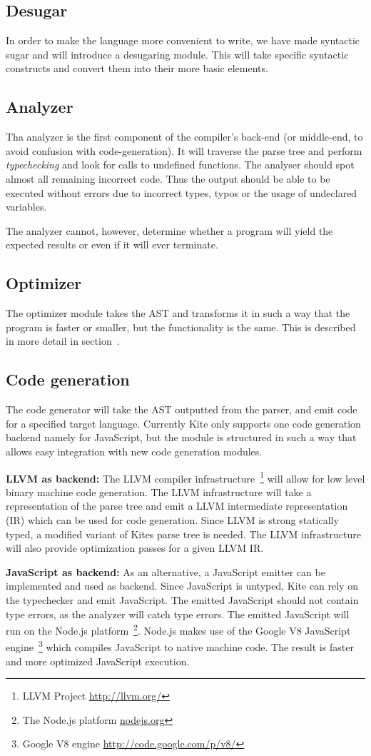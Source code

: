 \subsection{Desugar}
In order to make the language more convenient to write, we have made syntactic sugar and will introduce a desugaring module. This will take specific syntactic constructs and convert them into their more basic elements.


\subsection{Analyzer}
Tha analyzer is the first component of the compiler's back-end (or middle-end, to avoid confusion with code-generation). It will traverse the parse tree and perform \emph{typechecking} and look for calls to undefined functions. The analyser should spot almost all remaining incorrect code. Thus the output should be able to be executed without errors due to incorrect types, typos or the usage of undeclared variables.

The analyzer cannot, however, determine whether a program will yield the expected results or even if it will ever terminate.


\subsection{Optimizer}
The optimizer module takes the AST and transforms it in such a way that the program is faster or smaller, but the functionality is the same. This is described in more detail in section~.


\subsection{Code generation}
The code generator will take the AST outputted from the parser, and emit code for a specified target language. Currently Kite only supports one code generation backend namely for JavaScript, but the module is structured in such a way that allows easy integration with new code generation modules.

\textbf{LLVM as backend:}
The LLVM compiler infrastructure~\footnote{LLVM Project \url{http://llvm.org/}} will allow for low level binary machine code generation. The LLVM infrastructure will take a representation of the parse tree and emit a LLVM intermediate representation (IR) which can be used for code generation. Since LLVM is strong statically typed, a modified variant of Kites parse tree is needed. The LLVM infrastructure will also provide optimization passes for a given LLVM IR.

\textbf{JavaScript as backend:}
As an alternative, a JavaScript emitter can be implemented and used as backend. Since JavaScript is untyped, Kite can rely on the typechecker and emit JavaScript. The emitted JavaScript should not contain type errors, as the analyzer will catch type errors. The emitted JavaScript will run on the Node.js platform~\footnote{ The Node.js platform \url{nodejs.org}}. Node.js makes use of the Google V8 JavaScript engine~\footnote{Google   V8 engine \url{http://code.google.com/p/v8/}} which compiles JavaScript to native machine code. The result is faster and more optimized JavaScript execution.